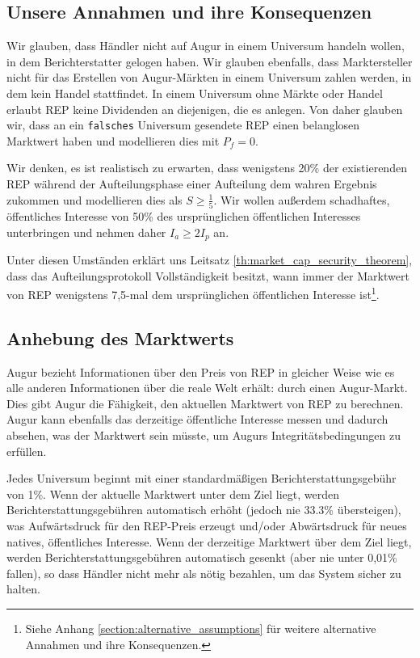 \documentclass[floatfix,reprint,nofootinbib,amsmath,amssymb,epsfig,pre,floats,letterpaper,groupedaffiliation]{revtex4-1}
\theoremstyle{definition}
\theoremstyle{definition}
\theoremstyle{definition}
\begin{document}
\subsection{Unsere Annahmen und ihre Konsequenzen}

Wir glauben, dass Händler nicht auf Augur in einem Universum handeln wollen, in dem Berichterstatter gelogen haben. Wir glauben ebenfalls, dass Marktersteller nicht für das Erstellen von Augur-Märkten in einem Universum zahlen werden, in dem kein Handel stattfindet. In einem Universum ohne Märkte oder Handel erlaubt REP keine Dividenden an diejenigen, die es anlegen. Von daher glauben wir, dass an ein \texttt{falsches} Universum gesendete REP einen belanglosen Marktwert haben und modellieren dies mit $P_f = 0$.

Wir denken, es ist realistisch zu erwarten, dass wenigstens 20\% der existierenden REP während der Aufteilungsphase einer Aufteilung dem wahren Ergebnis zukommen und modellieren dies als $S \geq \frac{1}{5}$. Wir wollen außerdem schadhaftes, öffentliches Interesse von 50\% des ursprünglichen öffentlichen Interesses unterbringen und nehmen daher $I_a \geq 2 I_p$ an.

Unter diesen Umständen erklärt uns Leitsatz \ref{th:market_cap_security_theorem}, dass das Aufteilungsprotokoll Vollständigkeit besitzt, wann immer der Marktwert von REP wenigstens 7,5-mal dem ursprünglichen öffentlichen Interesse ist\footnote{Siehe Anhang \ref{section:alternative_assumptions} für weitere alternative Annahmen und ihre Konsequenzen.}.

\subsection{Anhebung des Marktwerts}\label{section:market_cap_nudges}

Augur bezieht Informationen über den Preis von REP in gleicher Weise wie es alle anderen Informationen über die reale Welt erhält: durch einen Augur-Markt. Dies gibt Augur die Fähigkeit, den aktuellen Marktwert von REP zu berechnen. Augur kann ebenfalls das derzeitige öffentliche Interesse messen und dadurch absehen, was der Marktwert sein müsste, um Augurs Integritätsbedingungen zu erfüllen.

Jedes Universum beginnt mit einer standardmäßigen Berichterstattungsgebühr von 1\%. Wenn der aktuelle Marktwert unter dem Ziel liegt, werden Berichterstattungsgebühren automatisch erhöht (jedoch nie 33.3\% übersteigen), was Aufwärtsdruck für den REP-Preis erzeugt und/oder Abwärtsdruck für neues natives, öffentliches Interesse. Wenn der derzeitige Marktwert über dem Ziel liegt, werden Berichterstattungsgebühren automatisch gesenkt (aber nie unter 0,01\% fallen), so dass Händler nicht mehr als nötig bezahlen, um das System sicher zu halten.
\end{document}
